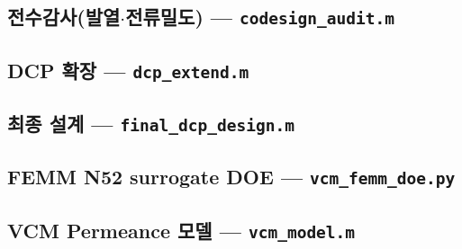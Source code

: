\documentclass[10pt,twocolumn,letterpaper]{article}
\begin{document}
\subsection{전수감사(발열$\cdot$전류밀도) — \texttt{codesign\_audit.m}}

\subsection{DCP 확장 — \texttt{dcp\_extend.m}}

\subsection{최종 설계 — \texttt{final\_dcp\_design.m}}

\subsection{FEMM N52 surrogate DOE — \texttt{vcm\_femm\_doe.py}}

\subsection{VCM Permeance 모델 — \texttt{vcm\_model.m}}

\end{document}
